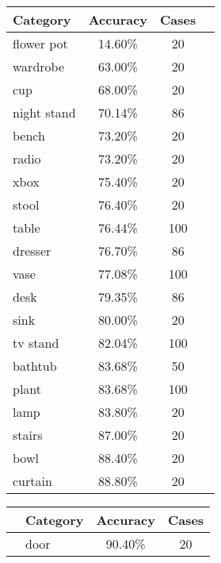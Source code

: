 \begin{table}[]
	\centering
	\begin{tabular}[t]{lccl}
		\hline
		\textbf{Category} & \textbf{Accuracy} & \textbf{Cases} & \hspace{4pt}\\ \hline
		flower pot        & 14.60\%           & 20             & \\
		wardrobe          & 63.00\%           & 20             & \\
		cup               & 68.00\%           & 20             & \\
		night stand       & 70.14\%           & 86             & \\
		bench             & 73.20\%           & 20             & \\
		radio             & 73.20\%           & 20             & \\
		xbox              & 75.40\%           & 20             & \\
		stool             & 76.40\%           & 20             & \\
		table             & 76.44\%           & 100            & \\
		dresser           & 76.70\%           & 86             & \\
		vase              & 77.08\%           & 100            & \\
		desk              & 79.35\%           & 86             & \\
		sink              & 80.00\%           & 20             & \\
		tv stand          & 82.04\%           & 100            & \\
		bathtub           & 83.68\%           & 50             & \\
		plant             & 83.68\%           & 100            & \\
		lamp              & 83.80\%           & 20             & \\
		stairs            & 87.00\%           & 20             & \\
		bowl              & 88.40\%           & 20             & \\
		curtain           & 88.80\%           & 20 & \\ \hline
	\end{tabular}
	\begin{tabular}[t]{llcc}
		\hline
		             & \textbf{Category} & \textbf{Accuracy} & \textbf{Cases} \\ \hline
		\hspace{4pt} & door              & 90.40\%           & 20             \\

\end{tabular}
\end{table}
